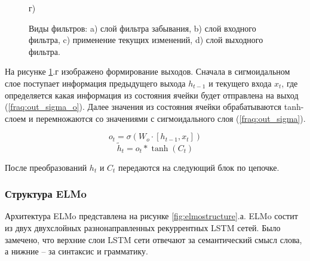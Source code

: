 \documentclass[a4paper,14pt]{article}
\begin{document}
\begin{figure}[H]
\begin{minipage}[h]{0.4\linewidth}
	\end{minipage}
	\hfill
	\begin{minipage}[h]{0.4\linewidth}
		 г) \\
	\end{minipage}
	\caption{Виды фильтров: 
		 a) слой фильтра забывания,
		 b) слой входного фильтра,
		 c) применение текущих изменений,
		 d) слой выходного фильтра.}
	\label{fig:LSTM_layers}
\end{figure}

На рисунке \ref{fig:LSTM_layers}.г изображено формирование выходов.
Сначала в сигмоидальном слое поступает информация предыдущего выхода $h_{t−1}$ и текущего входа $x_t$, где определяется какая информация из состояния ячейки будет отправлена на выход (\ref{fraq:out_sigma_o}).
Далее значения из состояния ячейки обрабатываются tanh-слоем и перемножаются со значениями с сигмоидального слоя (\ref*{fraq:out_sigma}).

\begin{equation}
	o_t = \sigma(W_o\cdot[h_{t-1},x_t]) 
	\label{fraq:out_sigma_o}
\end{equation}
\begin{equation}
	\tilde h_t = o_t * \tanh(C_t)
	\label{fraq:out_sigma}
\end{equation}

После преобразований $h_t$ и $C_t$ передаются на следующий блок по цепочке.	

\subsubsection{Структура ELMo}

Архитектура ELMo представлена на рисунке \ref{fig:elmostructure}.а.
ELMo состит из двух двухслойных разнонаправленных рекуррентных LSTM сетей.
Было замечено, что верхние слои LSTM сети отвечают за семантический смысл слова, а нижние -- за синтаксис и грамматику.
\end{document}
